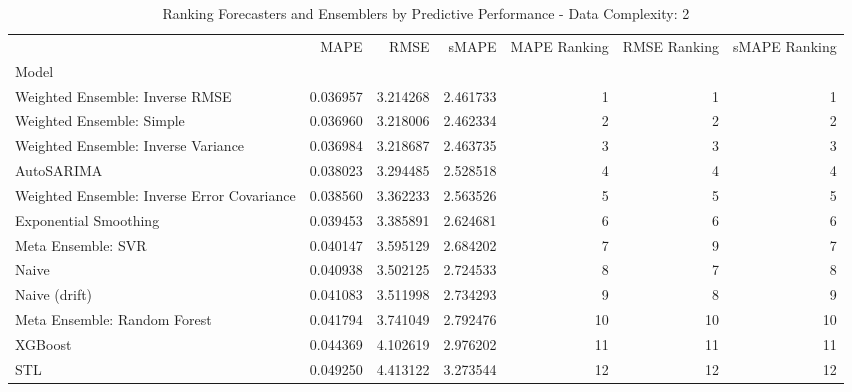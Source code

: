 \begin{table}
\caption{Ranking Forecasters and Ensemblers by Predictive Performance - Data Complexity: 2}
\begin{tabular}{lrrrrrr}
\toprule
 & MAPE & RMSE & sMAPE & MAPE Ranking & RMSE Ranking & sMAPE Ranking \\
Model &  &  &  &  &  &  \\
\midrule
Weighted Ensemble: Inverse RMSE & 0.036957 & 3.214268 & 2.461733 & 1 & 1 & 1 \\
Weighted Ensemble: Simple & 0.036960 & 3.218006 & 2.462334 & 2 & 2 & 2 \\
Weighted Ensemble: Inverse Variance & 0.036984 & 3.218687 & 2.463735 & 3 & 3 & 3 \\
AutoSARIMA & 0.038023 & 3.294485 & 2.528518 & 4 & 4 & 4 \\
Weighted Ensemble: Inverse Error Covariance & 0.038560 & 3.362233 & 2.563526 & 5 & 5 & 5 \\
Exponential Smoothing & 0.039453 & 3.385891 & 2.624681 & 6 & 6 & 6 \\
Meta Ensemble: SVR & 0.040147 & 3.595129 & 2.684202 & 7 & 9 & 7 \\
Naive & 0.040938 & 3.502125 & 2.724533 & 8 & 7 & 8 \\
Naive (drift) & 0.041083 & 3.511998 & 2.734293 & 9 & 8 & 9 \\
Meta Ensemble: Random Forest & 0.041794 & 3.741049 & 2.792476 & 10 & 10 & 10 \\
XGBoost & 0.044369 & 4.102619 & 2.976202 & 11 & 11 & 11 \\
STL & 0.049250 & 4.413122 & 3.273544 & 12 & 12 & 12 \\
\bottomrule
\end{tabular}
\end{table}

